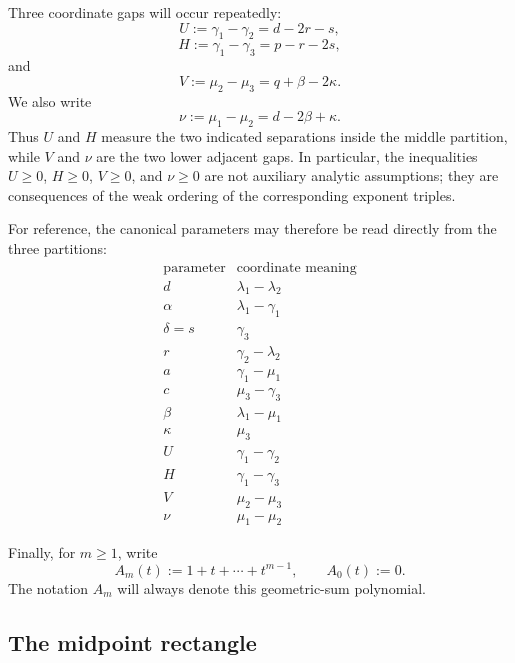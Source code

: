 \documentclass[11pt]{article}
\theoremstyle{definition}
\begin{document}
Three coordinate gaps will occur repeatedly:
\begin{equation*}
U:=\gamma_1-\gamma_2=d-2r-s,
\end{equation*}
\begin{equation*}
H:=\gamma_1-\gamma_3=p-r-2s,
\end{equation*}
and
\begin{equation*}
V:=\mu_2-\mu_3=q+\beta-2\kappa.
\end{equation*}
We also write
\begin{equation*}
\nu:=\mu_1-\mu_2=d-2\beta+\kappa.
\end{equation*}
Thus \(U\) and \(H\) measure the two indicated separations inside the middle partition, while \(V\) and \(\nu\) are the two lower adjacent gaps.  In particular, the inequalities \(U\ge0\), \(H\ge0\), \(V\ge0\), and \(\nu\ge0\) are not auxiliary analytic assumptions; they are consequences of the weak ordering of the corresponding exponent triples.

For reference, the canonical parameters may therefore be read directly from the three partitions:
\begin{equation*}
\begin{array}{c|c}
\text{parameter} & \text{coordinate meaning}\\ \hline
d & \lambda_1-\lambda_2\\
\alpha & \lambda_1-\gamma_1\\
\delta=s & \gamma_3\\
r & \gamma_2-\lambda_2\\
a & \gamma_1-\mu_1\\
c & \mu_3-\gamma_3\\
\beta & \lambda_1-\mu_1\\
\kappa & \mu_3\\
U & \gamma_1-\gamma_2\\
H & \gamma_1-\gamma_3\\
V & \mu_2-\mu_3\\
\nu & \mu_1-\mu_2
\end{array}
\end{equation*}

Finally, for \(m\ge1\), write
\begin{equation*}
A_m(t):=1+t+\cdots+t^{m-1},
\qquad
A_0(t):=0.
\end{equation*}
The notation \(A_m\) will always denote this geometric-sum polynomial.

\subsection{The midpoint rectangle}
\end{document}
